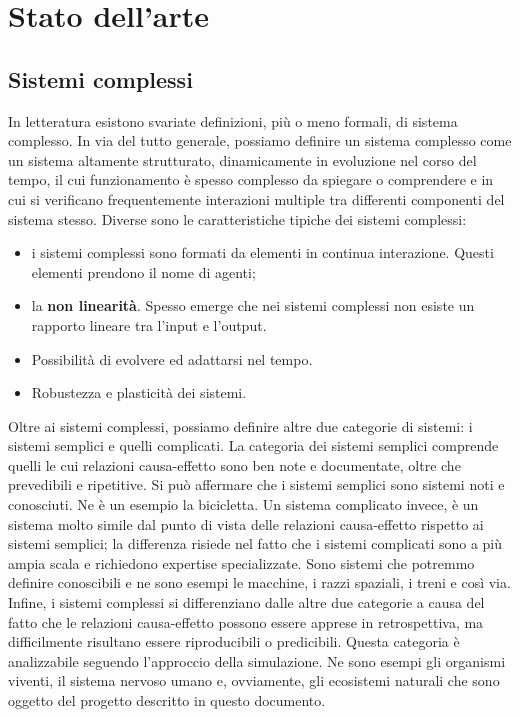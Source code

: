 \documentclass[11pt]{article}
\begin{document}
\section{Stato dell'arte}
\subsection{Sistemi complessi}
In letteratura esistono svariate definizioni, più o meno formali, di sistema complesso. In via del tutto generale, possiamo definire un sistema complesso come un sistema altamente strutturato, dinamicamente in evoluzione nel corso del tempo, il cui funzionamento è spesso complesso da spiegare o comprendere e in cui si verificano frequentemente interazioni multiple tra differenti componenti del sistema stesso. Diverse sono le caratteristiche tipiche dei sistemi complessi: 
\begin{itemize}
    \item i sistemi complessi sono formati da elementi in continua interazione. Questi elementi prendono il nome di agenti;
    \item la \textbf{non linearità}. Spesso emerge che nei sistemi complessi non esiste un rapporto lineare tra l'input e l'output.
    \item Possibilità di evolvere ed adattarsi nel tempo. 
    \item Robustezza e plasticità dei sistemi. 
\end{itemize}
Oltre ai sistemi complessi, possiamo definire altre due categorie di sistemi: i sistemi semplici e quelli complicati. La categoria dei sistemi semplici comprende quelli le cui relazioni causa-effetto sono ben note e documentate, oltre che prevedibili e ripetitive. Si può affermare che i sistemi semplici sono sistemi noti e conosciuti. Ne è un esempio la bicicletta. Un sistema complicato invece, è un sistema molto simile dal punto di vista delle relazioni causa-effetto rispetto ai sistemi semplici; la differenza risiede nel fatto che i sistemi complicati sono a più ampia scala e richiedono expertise specializzate. Sono sistemi che potremmo definire conoscibili e ne sono esempi le macchine, i razzi spaziali, i treni e così via. Infine, i sistemi complessi si differenziano dalle altre due categorie a causa del fatto che le relazioni causa-effetto possono essere apprese in retrospettiva, ma difficilmente risultano essere riproducibili o predicibili. Questa categoria è analizzabile seguendo l'approccio della simulazione. Ne sono esempi gli organismi viventi, il sistema nervoso umano e, ovviamente, gli ecosistemi naturali che sono oggetto del progetto descritto in questo documento. 
\end{document}
